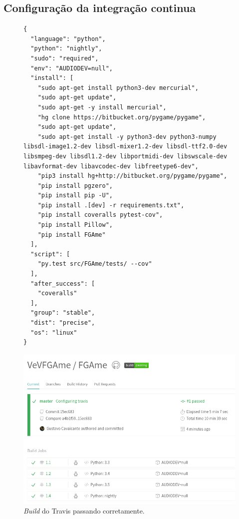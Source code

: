 \begin{anexosenv}

\chapter{Configuração da integração continua}
\label{sec:anexo2}

\begin{figure}[!htb]
\begin{lstlisting}
{
  "language": "python",
  "python": "nightly",
  "sudo": "required",
  "env": "AUDIODEV=null",
  "install": [
    "sudo apt-get install python3-dev mercurial",
    "sudo apt-get update",
    "sudo apt-get -y install mercurial",
    "hg clone https://bitbucket.org/pygame/pygame",
    "sudo apt-get update",
    "sudo apt-get install -y python3-dev python3-numpy libsdl-image1.2-dev libsdl-mixer1.2-dev libsdl-ttf2.0-dev libsmpeg-dev libsdl1.2-dev libportmidi-dev libswscale-dev libavformat-dev libavcodec-dev libfreetype6-dev",
    "pip3 install hg+http://bitbucket.org/pygame/pygame",
    "pip install pgzero",
    "pip install pip -U",
    "pip install .[dev] -r requirements.txt",
    "pip install coveralls pytest-cov",
    "pip install Pillow",
    "pip install FGAme"
  ],
  "script": [
    "py.test src/FGAme/tests/ --cov"
  ],
  "after_success": [
    "coveralls"
  ],
  "group": "stable",
  "dist": "precise",
  "os": "linux"
}
\end{lstlisting}
\end{figure}

\begin{figure}[!htb]
\centering
\includegraphics[scale=0.6]{figuras/build}
\caption{\textit{Build} do Travis passando corretamente.}
\label{Rotulo}
\end{figure}

\end{anexosenv}